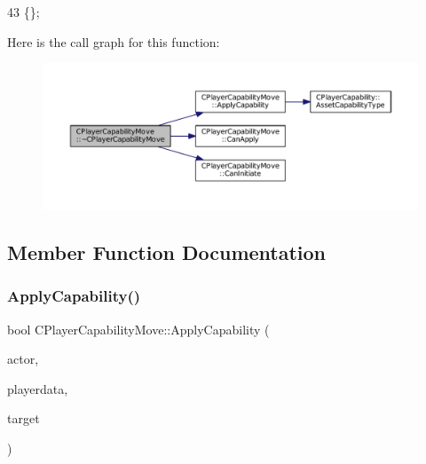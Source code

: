 \begin{DoxyCode}
43 \{\};
\end{DoxyCode}
Here is the call graph for this function\+:\nopagebreak
\begin{figure}[H]
\begin{center}
\leavevmode
\includegraphics[width=350pt]{classCPlayerCapabilityMove_ab355e3a0f8c82ee10b5ccf95c9e32d89_cgraph}
\end{center}
\end{figure}


\subsection{Member Function Documentation}
\hypertarget{classCPlayerCapabilityMove_ade3f4e72612cbf2ad73a6c2e6aa843df}{}\label{classCPlayerCapabilityMove_ade3f4e72612cbf2ad73a6c2e6aa843df} 
\subsubsection{\texorpdfstring{Apply\+Capability()}{ApplyCapability()}}
{\footnotesize\ttfamily bool C\+Player\+Capability\+Move\+::\+Apply\+Capability (\begin{DoxyParamCaption}\item[{std\+::shared\+\_\+ptr$<$ \hyperlink{classCPlayerAsset}{C\+Player\+Asset} $>$}]{actor,  }\item[{std\+::shared\+\_\+ptr$<$ \hyperlink{classCPlayerData}{C\+Player\+Data} $>$}]{playerdata,  }\item[{std\+::shared\+\_\+ptr$<$ \hyperlink{classCPlayerAsset}{C\+Player\+Asset} $>$}]{target }\end{DoxyParamCaption})\hspace{0.3cm}{\ttfamily [virtual]}}



